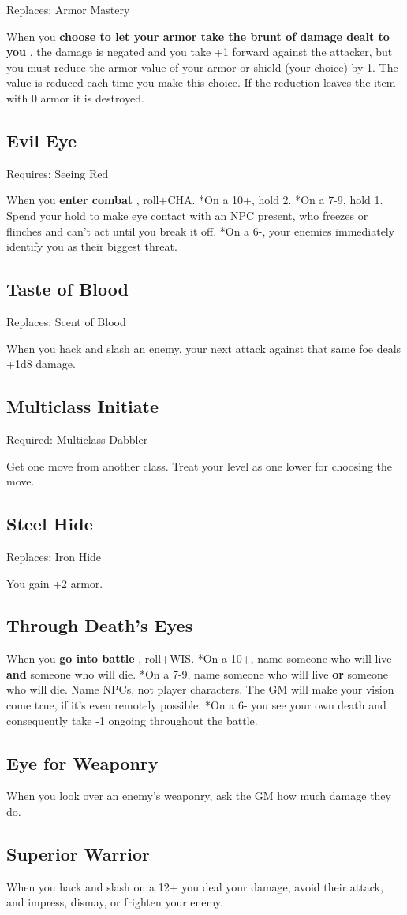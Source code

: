 Replaces: Armor Mastery

When you \textbf{choose to let your armor take the brunt of damage dealt to you}
, the damage is negated and you take +1 forward against the attacker, but you must reduce the armor value of your armor or shield (your choice) by 1. The value is reduced each time you make this choice. If the reduction leaves the item with 0 armor it is destroyed.
\subsection{Evil Eye}

Requires: Seeing Red

When you \textbf{enter combat}
, roll+CHA. *On a 10+, hold 2. *On a 7-9, hold 1. Spend your hold to make eye contact with an NPC present, who freezes or flinches and can't act until you break it off. *On a 6-, your enemies immediately identify you as their biggest threat.
\subsection{Taste of Blood}

Replaces: Scent of Blood

When you hack and slash an enemy, your next attack against that same foe deals +1d8 damage.
\subsection{Multiclass Initiate}

Required: Multiclass Dabbler

Get one move from another class. Treat your level as one lower for choosing the move.
\subsection{Steel Hide}

Replaces: Iron Hide

You gain +2 armor.
\subsection{Through Death's Eyes}

When you \textbf{go into battle}
, roll+WIS. *On a 10+, name someone who will live \textbf{and}
someone who will die. *On a 7-9, name someone who will live \textbf{or}
someone who will die. Name NPCs, not player characters. The GM will make your vision come true, if it's even remotely possible. *On a 6- you see your own death and consequently take -1 ongoing throughout the battle.
\subsection{Eye for Weaponry}

When you look over an enemy's weaponry, ask the GM how much damage they do.
\subsection{Superior Warrior}

When you hack and slash on a 12+ you deal your damage, avoid their attack, and impress, dismay, or frighten your enemy.


